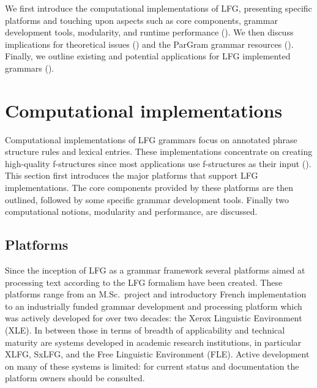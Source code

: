 \documentclass[output=paper,hidelinks]{langscibook}
\begin{document}
We first introduce the computational implementations of LFG, presenting specific platforms and touching upon aspects such as core components, grammar development tools, modularity, and runtime performance (). We then discuss implications for theoretical issues () and the ParGram grammar resources (). Finally, we outline existing and potential applications for LFG implemented grammars ().


\section{Computational implementations}
\label{sec:compimpl}

Computational implementations of LFG grammars focus on annotated phrase structure rules and lexical entries.
These implementations concentrate on creating high-quality f-structures since most applications use f-structures as their input (). This section first introduces the major platforms that support LFG implementations. The core components provided by these platforms are then outlined, followed by some specific grammar development tools. Finally two computational notions, modularity and performance, are discussed.

%

\subsection{Platforms}
\label{sec:systems}

Since the inception of LFG as a grammar framework several  platforms  aimed at processing text according to the LFG formalism have been created. These platforms range from an M.Sc.\ project \citep{Minos2014} and introductory French implementation \citep{zweigenbaum91} to an industrially funded grammar development and processing platform which was actively developed for over two decades: the Xerox Linguistic Environment (XLE). In between those in terms of breadth of applicability and technical maturity are systems developed in academic research institutions, in particular XLFG, SxLFG, and the Free Linguistic Environment (FLE). Active development on many of these systems is limited: for current status and documentation the platform owners should be consulted.
\end{document}
